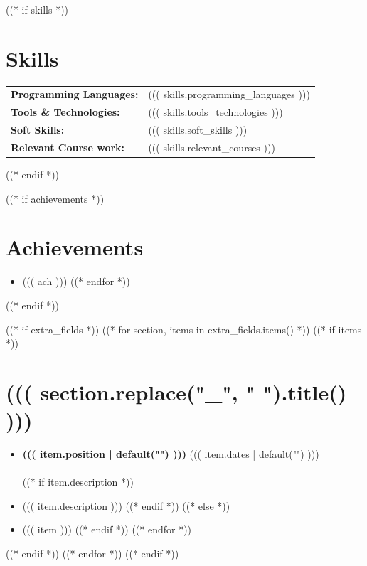 \documentclass[a4paper,10pt]{article}
\newcommand{\resumeItem}[1]{\item #1}
\newcommand{\resumeSubheading}[4]{
  \textbf{#1} \hfill #2 \\
  \textit{#3} \hfill \textit{#4} \\
}
\begin{document}
((* if skills *))
\section*{Skills}
\begin{tabular}{@{}l p{12cm}}
\textbf{Programming Languages:} & ((( skills.programming_languages ))) \\
\textbf{Tools \& Technologies:} & ((( skills.tools_technologies ))) \\
\textbf{Soft Skills:} & ((( skills.soft_skills ))) \\
\textbf{Relevant Course work:} & ((( skills.relevant_courses ))) \\
\end{tabular}
((* endif *))



((* if achievements *))
\section*{Achievements}
\begin{itemize}[leftmargin=0.15in]
  ((* for ach in achievements *))
  \resumeItem{ ((( ach ))) }
  ((* endfor *))
\end{itemize}
((* endif *))

((* if extra_fields *))
((* for section, items in extra_fields.items() *))
((* if items *))
\section*{((( section.replace("_", " ").title() )))}
\begin{itemize}[leftmargin=0.15in]
  ((* for item in items *))
    ((* if item is mapping *))
      \item[] \resumeSubheading
        {((( item.position | default("") )))}
        {((( item.dates | default("") )))}
        { }
        { }
      ((* if item.description *))
        \resumeItem{((( item.description )))}
      ((* endif *))
    ((* else *))
      \resumeItem{((( item )))}
    ((* endif *))
  ((* endfor *))
\end{itemize}
((* endif *))
((* endfor *))
((* endif *))
\end{document}
